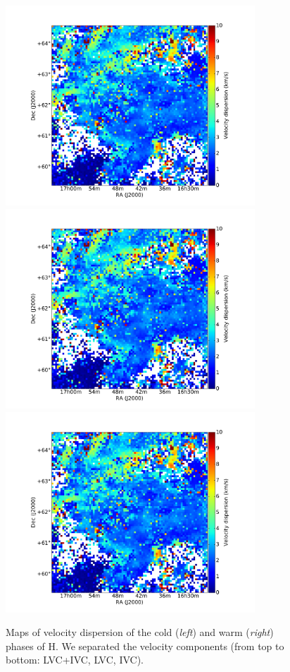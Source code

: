 \documentclass[traditabstract]{aa}
\begin{document}
\begin{figure}[h]
  \hspace{5mm}
  \includegraphics[page=5,height=7.5cm,trim=110 35 105 75,clip=true]{Figures/Phases_GHIGLS/GHIGLS_disp.pdf} \\
  \vspace{5mm}
  \includegraphics[page=3,height=7.5cm,trim=110 35 105 75,clip=true]{Figures/Phases_GHIGLS/GHIGLS_disp.pdf}
  \hspace{5mm}
  \includegraphics[page=6,height=7.5cm,trim=110 35 105 75,clip=true]{Figures/Phases_GHIGLS/GHIGLS_disp.pdf}
  \caption{Maps of velocity dispersion of the cold (\emph{left}) and warm (\emph{right}) phases of H. We separated the velocity components (from top to bottom: LVC+IVC, LVC, IVC).}
\end{figure}
\end{document}
